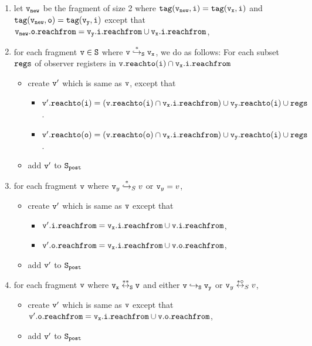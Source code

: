 \begin{description}
\begin{enumerate}
\item let $\tt v_{new}$ be the fragment of size 2 where $\tt tag(v_{new},i) = tag(v_x, i)$ and $\tt tag(v_{new},o) = tag(\mathtt{v}_y,i)$ except that $\tt v_{new}.o.reachfrom = \mathtt{v}_y.i.reachfrom \cup v_x.i.reachfrom$,
\item  for each fragment $\tt v \in S$ where $\tt v \overset{*}\hookrightarrow_S v_x$, we do as follows: For each subset $\tt regs$ of observer registers in $\tt v.reachto(\tt i) \cap \tt v_x.i.reachfrom$
\begin{itemize}
\item create $\tt v'$ which is same as $\tt v$, except that
\begin{itemize}
\item $\tt v'.reachto(\tt i) = (\tt v.reachto(\tt i) \cap v_x.i.reachfrom) \cup \mathtt{v}_y.reachto(\tt i) \cup regs$.
\item $\tt v'.reachto(\tt o) = (\tt v.reachto(\tt o) \cap v_x.i.reachfrom) \cup \mathtt{v}_y.reachto(\tt i) \cup regs$.
\end{itemize}
\item add $\tt v'$ to $\tt S_{post}$
\end{itemize}

\item for each fragment $\tt v$ where $\mathtt{v}_y \overset{*}\hookrightarrow_S v$ or $\mathtt{v}_y = v$,
   
\begin{itemize}
	\item create  $\tt v'$ which is same as $\tt v$ except that
\begin{itemize}
 \item $\tt \mathtt{v}'.\mathtt{i}.\mathtt{reachfrom} = v_x.i.reachfrom \cup \tt \mathtt{v}.\mathtt{i}.\mathtt{reachfrom}$, 
\item $\tt \mathtt{v}'.\mathtt{o}.\mathtt{reachfrom} = v_x.i.reachfrom \cup \tt \mathtt{v}.\mathtt{o}.\mathtt{reachfrom}$, 
\end{itemize}
\item add $\tt v'$ to $\tt S_{post}$
\end{itemize}
\item for each fragment $\tt v$ where $\tt v_x \overset{**}\leftrightarrow_S v$ and either $\tt v \hookrightarrow_S \mathtt{v}_y$ or $\mathtt{v}_y \overset{*\circ}\leftrightarrow_S v$, 
\begin{itemize}
\item  create $\tt v'$ which is same as $\tt v$ except that $\tt \mathtt{v}'.\mathtt{o}.\mathtt{reachfrom} = v_x.i.reachfrom \cup \tt \mathtt{v}.\mathtt{o}.\mathtt{reachfrom}$, 
 \item add $\tt v'$ to $\tt S_{post}$ 
\end{itemize}



\end{enumerate}
\end{description}
